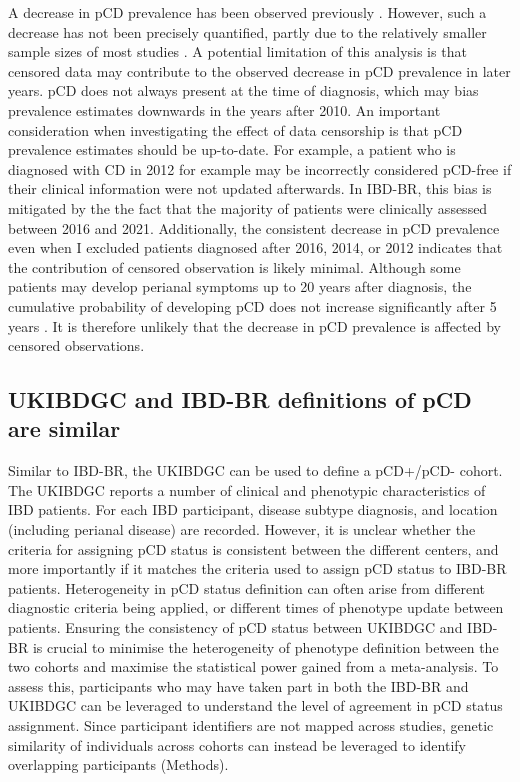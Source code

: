     A decrease in pCD prevalence has been observed previously \cite{Park2019-kj}. However, such a decrease has not been precisely quantified, partly due to the relatively smaller sample sizes of most studies \cite{Brochard2022-kz,Bruckner2018-ag,Gottgens2017-df,Tsai2022-kz}. A potential limitation of this analysis is that censored data may contribute to the observed decrease in pCD prevalence in later years. pCD does not always present at the time of diagnosis, which may bias prevalence estimates downwards in the years after 2010. An important consideration when investigating the effect of data censorship is that pCD prevalence estimates should be up-to-date. For example, a patient who is diagnosed with CD in 2012 for example may be incorrectly considered pCD-free if their clinical information were not updated afterwards. In IBD-BR, this bias is mitigated by the the fact that the majority of patients were clinically assessed between 2016 and 2021. Additionally, the consistent decrease in pCD prevalence even when I excluded patients diagnosed after 2016, 2014, or 2012 indicates that the contribution of censored observation is likely minimal. Although some patients may develop perianal symptoms up to 20 years after diagnosis, the cumulative probability of developing pCD does not increase significantly after 5 years \cite{Tsai2022-kz}. It is therefore unlikely that the decrease in pCD prevalence is affected by censored observations.

    \subsection{UKIBDGC and IBD-BR definitions of pCD are similar}
    Similar to IBD-BR, the UKIBDGC can be used to define a pCD+/pCD- cohort. The UKIBDGC reports a number of clinical and phenotypic characteristics of IBD patients. For each IBD participant, disease subtype diagnosis, and location (including perianal disease) are recorded. However, it is unclear whether the criteria for assigning pCD status is consistent between the different centers, and more importantly if it matches the criteria used to assign pCD status to IBD-BR patients. Heterogeneity in pCD status definition can often arise from different diagnostic criteria being applied, or different times of phenotype update between patients. Ensuring the consistency of pCD status between UKIBDGC and IBD-BR is crucial to minimise the heterogeneity of phenotype definition between the two cohorts and maximise the statistical power gained from a meta-analysis. 
To assess this, participants who may have taken part in both the IBD-BR and UKIBDGC can be leveraged to understand the level of agreement in pCD status assignment. Since participant identifiers are not mapped across studies, genetic similarity of individuals across cohorts can instead be leveraged to identify overlapping participants (Methods).\\

